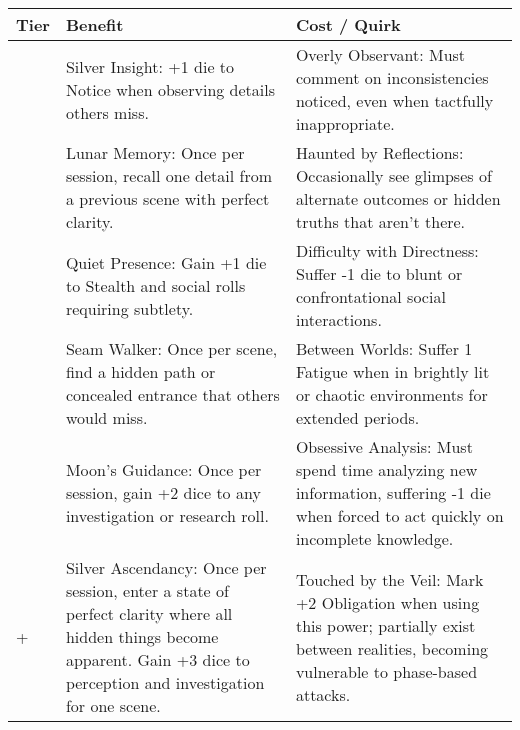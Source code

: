 \begin{longtable}{>{\raggedright\arraybackslash}p{1cm} p{5cm} p{5cm}}
\toprule
\textbf{Tier} & \textbf{Benefit} & \textbf{Cost / Quirk} \\
\midrule
1 & Silver Insight: +1 die to Notice when observing details others miss. & Overly Observant: Must comment on inconsistencies noticed, even when tactfully inappropriate. \\
\midrule
2 & Lunar Memory: Once per session, recall one detail from a previous scene with perfect clarity. & Haunted by Reflections: Occasionally see glimpses of alternate outcomes or hidden truths that aren't there. \\
\midrule
3 & Quiet Presence: Gain +1 die to Stealth and social rolls requiring subtlety. & Difficulty with Directness: Suffer -1 die to blunt or confrontational social interactions. \\
\midrule
4 & Seam Walker: Once per scene, find a hidden path or concealed entrance that others would miss. & Between Worlds: Suffer 1 Fatigue when in brightly lit or chaotic environments for extended periods. \\
\midrule
5 & Moon's Guidance: Once per session, gain +2 dice to any investigation or research roll. & Obsessive Analysis: Must spend time analyzing new information, suffering -1 die when forced to act quickly on incomplete knowledge. \\
\midrule
6+ & Silver Ascendancy: Once per session, enter a state of perfect clarity where all hidden things become apparent. Gain +3 dice to perception and investigation for one scene. & Touched by the Veil: Mark +2 Obligation when using this power; partially exist between realities, becoming vulnerable to phase-based attacks. \\
\bottomrule
\end{longtable}
